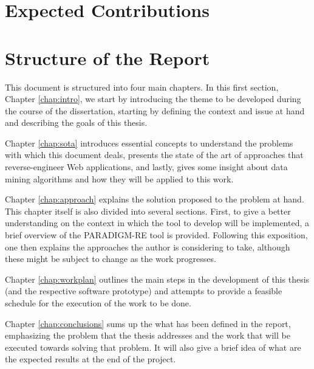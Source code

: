 \section{Expected Contributions} \label{sec:project}


\section{Structure of the Report} \label{sec:outline}

This document is structured into four main chapters. In this first section, Chapter \ref{chap:intro}, we start by introducing the theme to be developed during the course of the dissertation, starting by defining the context and issue at hand and describing the goals of this thesis.

Chapter \ref{chap:sota} introduces essential concepts to understand the problems with which this document deals, presents the state of the art of approaches that reverse-engineer Web applications, and lastly, gives some insight about data mining algorithms and how they will be applied to this work.

Chapter \ref{chap:approach} explains the solution proposed to the problem at hand. This chapter itself is also divided into several sections. First, to give a better understanding on the context in which the tool to develop will be implemented, a brief overview of the PARADIGM-RE tool is provided. Following this exposition, one then explains the approaches the author is considering to take, although these might be subject to change as the work progresses.

Chapter \ref{chap:workplan} outlines the main steps in the development of this thesis (and the respective software prototype) and attempts to provide a feasible schedule for the execution of the work to be done.

Chapter \ref{chap:conclusions} sums up the what has been defined in the report, emphasizing the problem that the thesis addresses and the work that will be executed towards solving that problem. It will also give a brief idea of what are the expected results at the end of the project.